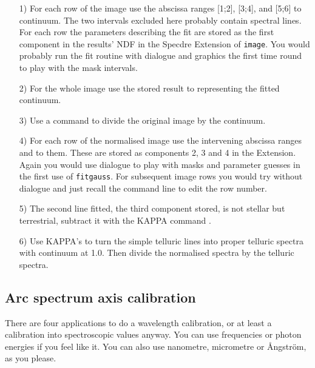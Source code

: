 \begin{itemize}
\item[1)] For each row of the image use the abscissa ranges
   [1;2], [3;4], and [5;6] to
   continuum. The two intervals excluded here probably contain spectral
   lines. For each row the parameters describing the fit are stored as
   the first component in the results' NDF in the Specdre Extension of
   {\tt image}. You would probably run the fit routine with dialogue and
   graphics the first time round to play with the mask intervals.

\item[2)] For the whole image use the stored result to
   representing the fitted continuum.

\item[3)] Use a
   command to divide the original image by the continuum.

\item[4)] For each row of the normalised image use the intervening
   abscissa ranges and
   to them. These are stored as components 2, 3 and 4 in the Extension.
   Again you would use dialogue to play with masks and parameter guesses
   in the first use of {\tt fitgauss}.  For subsequent image rows you
   would try without dialogue and just recall the command line to edit
   the row number.

\item[5)] The second line fitted, the third component stored, is not
   stellar but terrestrial, subtract it with the KAPPA command
{\tt{}}.

\item[6)] Use KAPPA's
{\tt{}}
   to turn the simple telluric lines into proper telluric spectra with
   continuum at 1.0. Then divide the normalised spectra by the telluric
   spectra.
\end{itemize}


\subsection{\label{specdreaxcalib}Arc spectrum axis calibration}

   There are four applications to do a wavelength calibration, or at
   least a calibration into spectroscopic values anyway.  You can use
   frequencies or photon energies if you feel like it.  You can also use
   nanometre, micrometre or \AA ngstr\"om, as you please.

